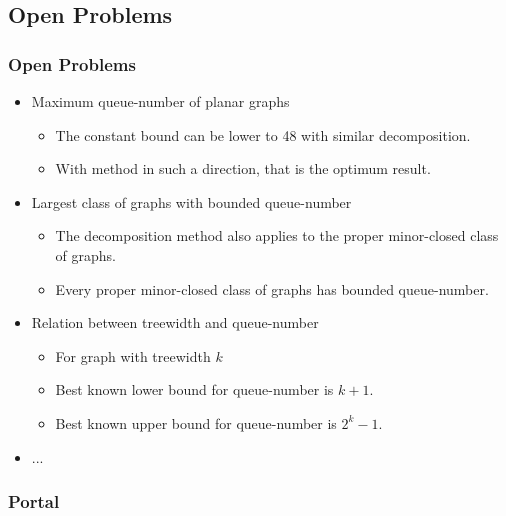 \documentclass{beamer}
\begin{document}
	\subsection{Open Problems}
	\begin{frame}
		\frametitle{Open Problems}
		\begin{itemize}[<+->]
			\item<1-> Maximum queue-number of planar graphs
			\begin{itemize}[<1->]
				\item The constant bound can be lower to 48 with similar decomposition.
				\item With method in such a direction, that is the optimum result.
			\end{itemize}
			\item<2-> Largest class of graphs with bounded queue-number
			\begin{itemize}[<2->]
				\item The decomposition method also applies to the proper minor-closed class of graphs.
				\item Every proper minor-closed class of graphs has bounded queue-number.
			\end{itemize}
			\item<3-> Relation between treewidth and queue-number
			\begin{itemize}[<3->]
				\item For graph with treewidth $k$
				\item Best known lower bound for queue-number is $k+1$.
				\item Best known upper bound for queue-number is $2^k - 1$.
			\end{itemize}
			\item<3-> ...
		\end{itemize}
	\end{frame}
	
	\begin{frame}
		\frametitle{Portal}
		\tableofcontents
	\end{frame}
	
\end{document}
